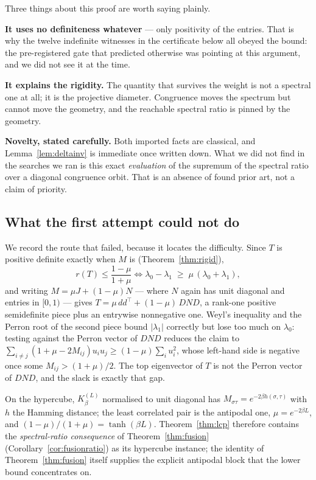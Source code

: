 \documentclass[11pt,a4paper]{article}
\theoremstyle{plain}
\theoremstyle{definition}
\begin{document}
Three things about this proof are worth saying plainly.

\textbf{It uses no definiteness whatever} --- only positivity of the entries.
That is why the twelve indefinite witnesses in the certificate below all obeyed
the bound: the pre-registered gate that predicted otherwise was pointing at this
argument, and we did not see it at the time.

\textbf{It explains the rigidity.} The quantity that survives the weight is not
a spectral one at all; it is the projective diameter. Congruence moves the
spectrum but cannot move the geometry, and the reachable spectral ratio is
pinned by the geometry.

\textbf{Novelty, stated carefully.} Both imported facts are classical, and
Lemma~\ref{lem:deltainv} is immediate once written down. What we did not find in
the searches we ran is this exact \emph{evaluation} of the supremum of the
spectral ratio over a diagonal congruence orbit. That is an absence of found
prior art, not a claim of priority.

\subsection*{What the first attempt could not do}

We record the route that failed, because it locates the difficulty. Since
$T$ is positive definite exactly when $M$ is (Theorem~\ref{thm:rigid}),
\[
  r(T)\le\frac{1-\mu}{1+\mu}
  \iff
  \lambda_0-\lambda_1\;\ge\;\mu\,(\lambda_0+\lambda_1),
\]
and writing $M=\mu J+(1-\mu)N$ --- where $N$ again has unit diagonal and
entries in $[0,1)$ --- gives $T=\mu\,dd^{\!\top}+(1-\mu)\,DND$, a rank-one
positive semidefinite piece plus an entrywise nonnegative one. Weyl's inequality
and the Perron root of the second piece bound $|\lambda_1|$ correctly but lose
too much on $\lambda_0$: testing against the Perron vector of $DND$ reduces the
claim to $\sum_{i\neq j}(1+\mu-2M_{ij})u_iu_j\ge(1-\mu)\sum_i u_i^2$, whose
left-hand side is negative once some $M_{ij}>(1+\mu)/2$. The top eigenvector of
$T$ is not the Perron vector of $DND$, and the slack is exactly that gap.

On the hypercube, $K_\beta^{(L)}$ normalised to unit diagonal has
$M_{\sigma\tau}=e^{-2\beta h(\sigma,\tau)}$ with $h$ the Hamming distance; the
least correlated pair is the antipodal one, $\mu=e^{-2\beta L}$, and
$(1-\mu)/(1+\mu)=\tanh(\beta L)$. Theorem~\ref{thm:lcp} therefore contains the
\emph{spectral-ratio consequence} of Theorem~\ref{thm:fusion}
(Corollary~\ref{cor:fusionratio}) as its hypercube instance; the identity of
Theorem~\ref{thm:fusion} itself supplies the explicit antipodal block that the
lower bound concentrates on.
\end{document}
